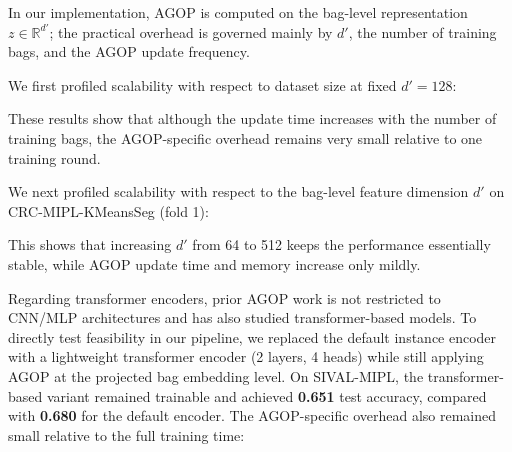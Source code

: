 \documentclass[11pt]{article}
\newcommand{\Rb}{\mathbb{R}}
\begin{document}
In our implementation, AGOP is computed on the bag-level representation $z\in\Rb^{d'}$; the practical overhead is governed mainly by $d'$, the number of training bags, and the AGOP update frequency.

We first profiled scalability with respect to dataset size at fixed $d'=128$:

\begin{center}
\end{center}

These results show that although the update time increases with the number of training bags, the AGOP-specific overhead remains very small relative to one training round.

We next profiled scalability with respect to the bag-level feature dimension $d'$ on CRC-MIPL-KMeansSeg (fold 1):

\begin{center}
\end{center}

This shows that increasing $d'$ from 64 to 512 keeps the performance essentially stable, while AGOP update time and memory increase only mildly.

Regarding transformer encoders, prior AGOP work is not restricted to CNN/MLP architectures and has also studied transformer-based models. To directly test feasibility in our pipeline, we replaced the default instance encoder with a lightweight transformer encoder (2 layers, 4 heads) while still applying AGOP at the projected bag embedding level. On SIVAL-MIPL, the transformer-based variant remained trainable and achieved \textbf{0.651} test accuracy, compared with \textbf{0.680} for the default encoder. The AGOP-specific overhead also remained small relative to the full training time:
\end{document}
